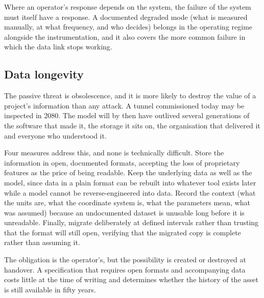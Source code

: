 Where an operator's response depends on the system, the failure of the system
must itself have a response. A documented degraded mode (what is measured
manually, at what frequency, and who decides) belongs in the operating
regime alongside the instrumentation, and it also covers the more
common failure in which the data link stops working.

\subsection{Data longevity}
\label{sec:data-longevity}

The passive threat is obsolescence, and it is more likely to destroy the value
of a project's information than any attack. A tunnel commissioned today may be
inspected in 2080. The model will by then have outlived several generations of
the software that made it, the storage it sits on, the organisation that
delivered it and everyone who understood it.

Four measures address this, and none is technically difficult. Store the
information in open, documented formats, accepting the loss of proprietary
features as the price of being readable. Keep the underlying data as well as
the model, since data in a plain format can be rebuilt into whatever tool
exists later while a model cannot be reverse-engineered into data. Record the
context (what the units are, what the coordinate system is, what the
parameters mean, what was assumed) because an undocumented dataset is
unusable long before it is unreadable. Finally, migrate deliberately at defined
intervals rather than trusting that the format will still open, verifying that
the migrated copy is complete rather than assuming it.

The obligation is the operator's, but the possibility is created or destroyed
at handover. A specification that requires open formats and accompanying data
costs little at the time of writing and determines whether the history of
the asset is still available in fifty years.

\chapterreferences

